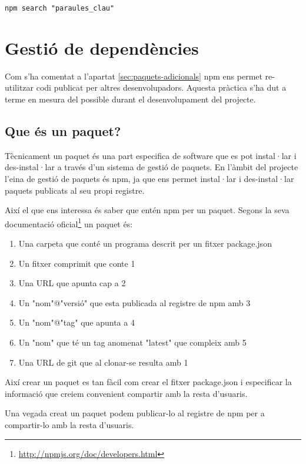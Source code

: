 \begin{verbatim}
npm search "paraules_clau"
\end{verbatim}

\section{Gestió de dependències}

Com s'ha comentat a l'apartat \ref{sec:paquets-adicionals} npm ens permet re-utilitzar codi publicat per altres desenvolupadors. Aquesta pràctica s'ha dut a terme en mesura del possible durant el desenvolupament del projecte.  

\subsection{Que és un paquet?}
\label{sec:que-es-un-paquet}

Tècnicament un paquet és una part especifica de software que es pot instal·lar i des-instal·lar a través d'un sistema de gestió de paquets. En l'àmbit del projecte l'eina de gestió de paquets és npm, ja que ens permet instal·lar i des-instal·lar paquets publicats al seu propi registre. 

Així el que ens interessa és saber que entén npm per un paquet. Segons la seva documentació oficial\footnote{\url{http://npmjs.org/doc/developers.html}} un paquet és: 

\begin{enumerate}
\item {Una carpeta que conté un programa descrit per un fitxer package.json}
\item {Un fitxer comprimit que conte 1}
\item {Una URL que apunta cap a 2}
\item {Un "nom"@"versió" que esta publicada al registre de npm amb 3}
\item {Un "nom"@"tag" que apunta a 4}
\item {Un "nom" que té un tag anomenat "latest" que compleix amb 5}
\item {Una URL de git que al clonar-se resulta amb 1}
\end{enumerate}

Així crear un paquet es tan fàcil com crear el fitxer package.json i especificar la informació que creiem convenient compartir amb la resta d'usuaris. 

Una vegada creat un paquet podem publicar-lo al registre de npm per a compartir-lo amb la resta d'usuaris. 

